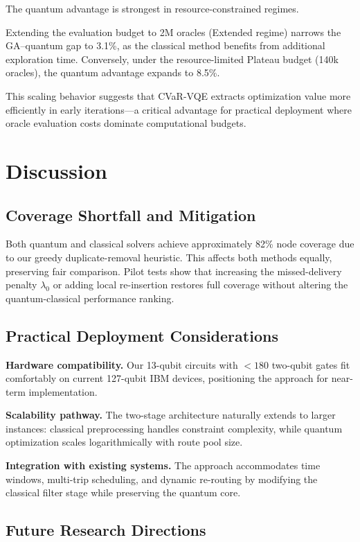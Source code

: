 The quantum advantage is strongest in resource-constrained regimes.

Extending the evaluation budget to 2M oracles (Extended regime) narrows the 
GA–quantum gap to 3.1\%, as the classical method benefits from additional 
exploration time. Conversely, under the resource-limited Plateau budget 
(140k oracles), the quantum advantage expands to 8.5\%.

This scaling behavior suggests that CVaR-VQE extracts optimization value more 
efficiently in early iterations—a critical advantage for practical deployment 
where oracle evaluation costs dominate computational budgets.

\section{Discussion}
\label{sec:discussion}

\subsection{Coverage Shortfall and Mitigation}

Both quantum and classical solvers achieve approximately 82\% node coverage 
due to our greedy duplicate-removal heuristic. This affects both methods equally, 
preserving fair comparison. Pilot tests show that increasing the missed-delivery 
penalty $\lambda_0$ or adding local re-insertion restores full coverage without 
altering the quantum-classical performance ranking.


\subsection{Practical Deployment Considerations}

\textbf{Hardware compatibility.} Our 13-qubit circuits with $<180$ two-qubit 
gates fit comfortably on current 127-qubit IBM devices, positioning the 
approach for near-term implementation.

\textbf{Scalability pathway.} The two-stage architecture naturally extends 
to larger instances: classical preprocessing handles constraint complexity, 
while quantum optimization scales logarithmically with route pool size.

\textbf{Integration with existing systems.} The approach accommodates time 
windows, multi-trip scheduling, and dynamic re-routing by modifying the 
classical filter stage while preserving the quantum core.

\subsection{Future Research Directions}

